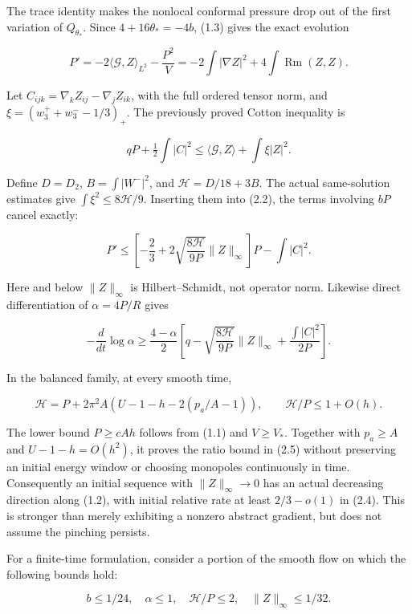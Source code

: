 \documentclass[
  10pt,
]{article}
\begin{document}
The trace identity makes the nonlocal conformal pressure drop out of the
first variation of \(Q_{\theta_*}\). Since \(4+16\theta_*=-4b\), (1.3)
gives the exact evolution

\[
 \boxed{P'=-2\langle\mathcal G,Z\rangle_{L^2}-\frac{P^2}V
          =-2\int|\nabla Z|^2+4\int\operatorname{Rm}(Z,Z).}     \tag{2.2}
\]

Let \(C_{ijk}=\nabla_kZ_{ij}-\nabla_jZ_{ik}\), with the full ordered
tensor norm, and \(\xi=(w_3^++w_3^--1/3)_+\). The previously proved
Cotton inequality is

\[
 qP+\tfrac12\int|C|^2
              \le\langle\mathcal G,Z\rangle+\int\xi|Z|^2.
\]

Define \(D=D_2\), \(B=\int|W^-|^2\), and \(\mathcal H=D/18+3B\). The
actual same-solution estimates give \(\int\xi^2\le8\mathcal H/9\).
Inserting them into (2.2), the terms involving \(bP\) cancel exactly:

\[
 \boxed{P'\le
    \left[-\frac23+2\sqrt{\frac{8\mathcal H}{9P}}\|Z\|_\infty\right]P
                      -\int|C|^2.}                            \tag{2.3}
\]

Here and below \(\|Z\|_\infty\) is Hilbert--Schmidt, not operator norm.
Likewise direct differentiation of \(\alpha=4P/R\) gives

\[
 \boxed{-\frac{d}{dt}\log\alpha\ge\frac{4-\alpha}{2}
 \left[q-\sqrt{\frac{8\mathcal H}{9P}}\|Z\|_\infty
                                  +\frac{\int|C|^2}{2P}\right].} \tag{2.4}
\]

In the balanced family, at every smooth time,

\[
 \mathcal H=P+2\pi^2A(U-1-h-2(p_a/A-1)),
 \qquad \mathcal H/P\le1+O(h).                      \tag{2.5}
\]

The lower bound \(P\ge cAh\) follows from (1.1) and \(V\ge V_*\).
Together with \(p_a\ge A\) and \(U-1-h=O(h^2)\), it proves the ratio
bound in (2.5) without preserving an initial energy window or choosing
monopoles continuously in time. Consequently an initial sequence with
\(\|Z\|_\infty\to0\) has an actual decreasing direction along (1.2),
with initial relative rate at least \(2/3-o(1)\) in (2.4). This is
stronger than merely exhibiting a nonzero abstract gradient, but does
not assume the pinching persists.

For a finite-time formulation, consider a portion of the smooth flow on
which the following bounds hold:

\[
 b\le1/24,\quad \alpha\le1,\quad \mathcal H/P\le2,
 \quad\|Z\|_\infty\le1/32.
\]
\end{document}
